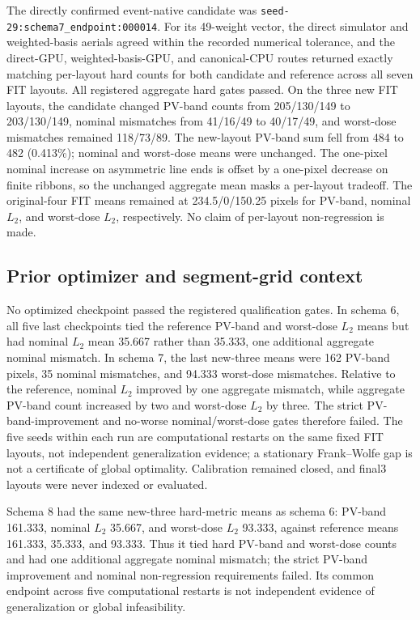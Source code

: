 \documentclass[conference]{IEEEtran}
\begin{document}
The directly confirmed event-native candidate was \texttt{seed-29:schema7\_endpoint:000014}. For its 49-weight vector, the direct simulator and weighted-basis aerials agreed within the recorded numerical tolerance, and the direct-GPU, weighted-basis-GPU, and canonical-CPU routes returned exactly matching per-layout hard counts for both candidate and reference across all seven FIT layouts. All registered aggregate hard gates passed. On the three new FIT layouts, the candidate changed PV-band counts from 205/130/149 to 203/130/149, nominal mismatches from 41/16/49 to 40/17/49, and worst-dose mismatches remained 118/73/89. The new-layout PV-band sum fell from 484 to 482 (0.413\%); nominal and worst-dose means were unchanged. The one-pixel nominal increase on asymmetric line ends is offset by a one-pixel decrease on finite ribbons, so the unchanged aggregate mean masks a per-layout tradeoff. The original-four FIT means remained at 234.5/0/150.25 pixels for PV-band, nominal $L_2$, and worst-dose $L_2$, respectively. No claim of per-layout non-regression is made.

\subsection{Prior optimizer and segment-grid context}



No optimized checkpoint passed the registered qualification gates. In schema 6, all five last checkpoints tied the reference PV-band and worst-dose $L_2$ means but had nominal $L_2$ mean 35.667 rather than 35.333, one additional aggregate nominal mismatch. In schema 7, the last new-three means were 162 PV-band pixels, 35 nominal mismatches, and 94.333 worst-dose mismatches. Relative to the reference, nominal $L_2$ improved by one aggregate mismatch, while aggregate PV-band count increased by two and worst-dose $L_2$ by three. The strict PV-band-improvement and no-worse nominal/worst-dose gates therefore failed. The five seeds within each run are computational restarts on the same fixed FIT layouts, not independent generalization evidence; a stationary Frank--Wolfe gap is not a certificate of global optimality. Calibration remained closed, and final3 layouts were never indexed or evaluated.

Schema 8 had the same new-three hard-metric means as schema 6: PV-band 161.333, nominal $L_2$ 35.667, and worst-dose $L_2$ 93.333, against reference means 161.333, 35.333, and 93.333. Thus it tied hard PV-band and worst-dose counts and had one additional aggregate nominal mismatch; the strict PV-band improvement and nominal non-regression requirements failed. Its common endpoint across five computational restarts is not independent evidence of generalization or global infeasibility.
\end{document}
